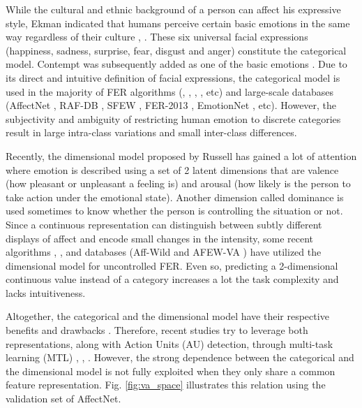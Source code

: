 \documentclass[a4paper, 10pt, conference]{ieeeconf}      \usepackage{FG2021}
\begin{document}
While the cultural and ethnic background of a person can affect his expressive style, Ekman indicated that humans perceive certain basic emotions in the same way regardless of their culture \cite{ekman1971constants}, \cite{ekman1994strong}. These six universal facial expressions (happiness, sadness, surprise, fear, disgust and anger) constitute the categorical model. Contempt was subsequently added as one of the basic emotions \cite{matsumoto1992more}. Due to its direct and intuitive definition of facial expressions, the categorical model is used in the majority of FER algorithms (\cite{cai2018island}, \cite{acharya2018covariance}, \cite{kervadec2018cake}, \cite{hu2017learning}, etc) and large-scale databases (AffectNet \cite{mollahosseini2017affectnet}, RAF-DB \cite{li2018reliable}, SFEW \cite{dhall2011static}, FER-2013 \cite{goodfellow2013challenges}, EmotionNet \cite{fabian2016emotionet}, etc). However, the subjectivity and ambiguity of restricting human emotion to discrete categories result in large intra-class variations and small inter-class differences.

Recently, the dimensional model proposed by Russell \cite{russell1980circumplex} has gained a lot of attention where emotion is described using a set of 2 latent dimensions that are valence (how pleasant or unpleasant a feeling is) and arousal (how likely is the person to take action under the emotional state). Another dimension called dominance is used sometimes to know whether the person is controlling the situation or not. Since a continuous representation can distinguish between subtly different displays of affect and encode small changes in the intensity, some recent algorithms \cite{nicolaou2011continuous}, \cite{chang2017fatauva}, \cite{kollias2019expression} and databases (Aff-Wild \cite{zafeiriou2017aff} and AFEW-VA \cite{kossaifi2017afew}) have utilized the dimensional model for uncontrolled FER. Even so, predicting a 2-dimensional continuous value instead of a category increases a lot the task complexity and lacks intuitiveness.

Altogether, the categorical and the dimensional model have their respective benefits and drawbacks \cite{kervadec2018cake}. Therefore, recent studies try to leverage both representations, along with Action Units (AU) detection, through multi-task learning (MTL) \cite{chang2017fatauva}, \cite{kollias2019expression}, \cite{xiaohua2019two}. However, the strong dependence between the categorical and the dimensional model is not fully exploited when they only share a common feature representation. Fig. \ref{fig:va_space} illustrates this relation using the validation set of AffectNet.
\end{document}
